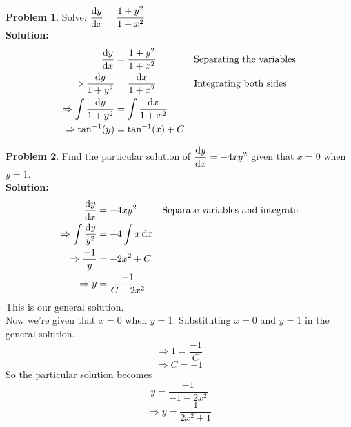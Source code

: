 \documentclass[14]{article}
\theoremstyle{definition}
\newtheorem{prob}{Problem}
\theoremstyle{case}
\begin{document}
\begin{prob}
Solve: $\dfrac{\dif y}{\dif x} = \dfrac{1+y^2}{1+x^2}$\\
\textbf{Solution: }
\begin{align*}
\dfrac{\dif y}{\dif x} &= \dfrac{1+y^2}{1+x^2} && \text{Separating the variables}\\
\Rightarrow\dfrac{\dif y}{1 + y^2} &= \dfrac{\dif x}{1 + x^2} && \text{Integrating both sides}\\
\Rightarrow\int\dfrac{\dif y}{1 + y^2} &= \int\dfrac{\dif x}{1 + x^2}\\
\Rightarrow \tan^{-1}(y) &= \tan^{-1}(x) + C
\end{align*}
\end{prob}
\pagebreak
\begin{prob}
Find the particular solution of $\dfrac{\dif y}{\dif x} = -4xy^2$ given that $x = 0$ when $y=1$.\\
\textbf{Solution:}
\begin{align*}
\dfrac{\dif y}{\dif x} &= -4xy^2 && \text{Separate variables and integrate}\\
\Rightarrow\int\dfrac{\dif y}{y^2} &= -4 \int x \dif x\\
\Rightarrow \dfrac{-1}{y} &= -2 x^2 + C\\
\Rightarrow y &= \dfrac{-1}{C-2x^2}
\end{align*}
This is our general solution.\\
Now we're given that $x = 0$ when $y = 1$. Substituting $x = 0$ and $y = 1$ in the general solution.
\[\Rightarrow 1 = \dfrac{-1}{C}\]
\[\Rightarrow C = -1\]
So the particular solution becomes
\[y = \dfrac{-1}{-1-2x^2}\]
\[\Rightarrow y = \dfrac1{2x^2 + 1}\]
\end{prob}
\end{document}
